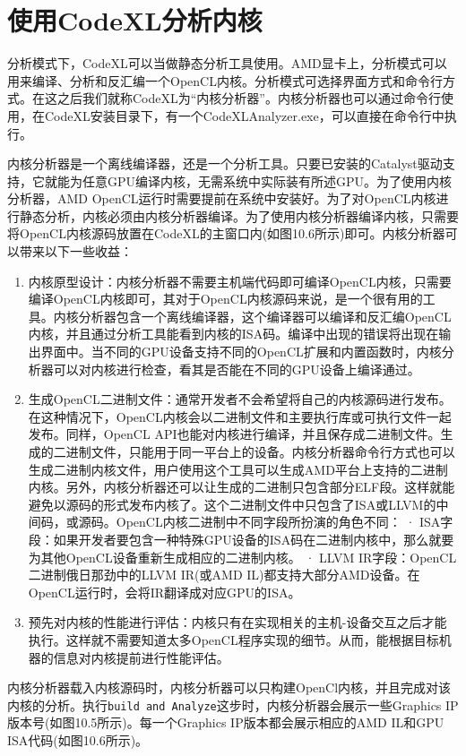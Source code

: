 \section{使用CodeXL分析内核}

分析模式下，CodeXL可以当做静态分析工具使用。AMD显卡上，分析模式可以用来编译、分析和反汇编一个OpenCL内核。分析模式可选择界面方式和命令行方式。在这之后我们就称CodeXL为“内核分析器”。内核分析器也可以通过命令行使用，在CodeXL安装目录下，有一个CodeXLAnalyzer.exe，可以直接在命令行中执行。

内核分析器是一个离线编译器，还是一个分析工具。只要已安装的Catalyst驱动支持，它就能为任意GPU编译内核，无需系统中实际装有所述GPU。为了使用内核分析器，AMD OpenCL运行时需要提前在系统中安装好。为了对OpenCL内核进行静态分析，内核必须由内核分析器编译。为了使用内核分析器编译内核，只需要将OpenCL内核源码放置在CodeXL的主窗口内(如图10.6所示)即可。内核分析器可以带来以下一些收益：

\begin{enumerate}
\item 内核原型设计：内核分析器不需要主机端代码即可编译OpenCL内核，只需要编译OpenCL内核即可，其对于OpenCL内核源码来说，是一个很有用的工具。内核分析器包含一个离线编译器，这个编译器可以编译和反汇编OpenCL内核，并且通过分析工具能看到内核的ISA码。编译中出现的错误将出现在输出界面中。当不同的GPU设备支持不同的OpenCL扩展和内置函数时，内核分析器可以对内核进行检查，看其是否能在不同的GPU设备上编译通过。
\item 生成OpenCL二进制文件：通常开发者不会希望将自己的内核源码进行发布。在这种情况下，OpenCL内核会以二进制文件和主要执行库或可执行文件一起发布。同样，OpenCL API也能对内核进行编译，并且保存成二进制文件。生成的二进制文件，只能用于同一平台上的设备。内核分析器命令行方式也可以生成二进制内核文件，用户使用这个工具可以生成AMD平台上支持的二进制内核。另外，内核分析器还可以让生成的二进制只包含部分ELF段。这样就能避免以源码的形式发布内核了。这个二进制文件中只包含了ISA或LLVM的中间码，或源码。OpenCL内核二进制中不同字段所扮演的角色不同： · ISA字段：如果开发者要包含一种特殊GPU设备的ISA码在二进制内核中，那么就要为其他OpenCL设备重新生成相应的二进制内核。 · LLVM IR字段：OpenCL二进制俄日那劲中的LLVM IR(或AMD IL)都支持大部分AMD设备。在OpenCL运行时，会将IR翻译成对应GPU的ISA。
\item 预先对内核的性能进行评估：内核只有在实现相关的主机-设备交互之后才能执行。这样就不需要知道太多OpenCL程序实现的细节。从而，能根据目标机器的信息对内核提前进行性能评估。
\end{enumerate}

内核分析器载入内核源码时，内核分析器可以只构建OpenCl内核，并且完成对该内核的分析。执行\texttt{build and Analyze}这步时，内核分析器会展示一些Graphics IP版本号(如图10.5所示)。每一个Graphics IP版本都会展示相应的AMD IL和GPU ISA代码(如图10.6所示)。

